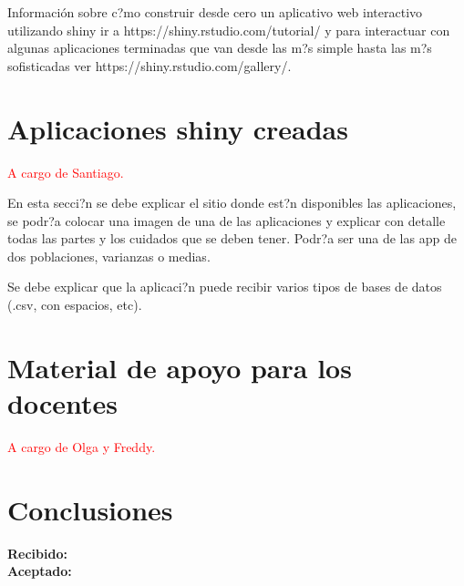 \documentclass[]{comunicaciones}
\newcommand{\pkg}[1]{{\normalfont\fontseries{b}\selectfont #1}}
\begin{document}
Información sobre c?mo construir desde cero un aplicativo web interactivo utilizando shiny ir a https://shiny.rstudio.com/tutorial/ y para interactuar con algunas aplicaciones terminadas que van desde las m?s simple hasta las m?s sofisticadas ver https://shiny.rstudio.com/gallery/.

\section{Aplicaciones \pkg{shiny} creadas}
\textcolor{red}{A cargo de Santiago.}

En esta secci?n se debe explicar el sitio donde est?n disponibles las aplicaciones, se podr?a colocar una imagen de una de las aplicaciones y explicar con detalle todas las partes y los cuidados que se deben tener. Podr?a ser una de las app de dos poblaciones, varianzas o medias.

Se debe explicar que la aplicaci?n puede recibir varios tipos de bases de datos (.csv, con espacios, etc).

\section{Material de apoyo para los docentes}

\textcolor{red}{A cargo de Olga y Freddy.}

\section{Conclusiones}

\begin{flushright}
\textbf{Recibido: }\\
\textbf{Aceptado: }
\end{flushright}

\nocite{*}
\end{document}
